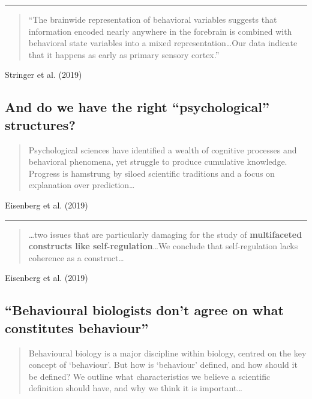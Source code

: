 \documentclass[
  letterpaper,
  DIV=11,
  numbers=noendperiod]{scrartcl}
\begin{document}
\begin{center}\rule{0.5\linewidth}{0.5pt}\end{center}

\begin{quote}
``The brainwide representation of behavioral variables suggests that
information encoded nearly anywhere in the forebrain is combined with
behavioral state variables into a mixed representation\ldots Our data
indicate that it happens as early as primary sensory cortex.''
\end{quote}

Stringer et al. (2019)

\subsection{And do we have the right ``psychological''
structures?}\label{and-do-we-have-the-right-psychological-structures}

\begin{quote}
Psychological sciences have identified a wealth of cognitive processes
and behavioral phenomena, yet struggle to produce cumulative knowledge.
Progress is hamstrung by siloed scientific traditions and a focus on
explanation over prediction\ldots{}
\end{quote}

Eisenberg et al. (2019)

\begin{center}\rule{0.5\linewidth}{0.5pt}\end{center}

\begin{quote}
\ldots two issues that are particularly damaging for the study of
\textbf{multifaceted constructs like self-regulation}\ldots We conclude
that self-regulation lacks coherence as a construct\ldots{}
\end{quote}

Eisenberg et al. (2019)

\subsection{``Behavioural biologists don't agree on what constitutes
behaviour''}\label{behavioural-biologists-dont-agree-on-what-constitutes-behaviour}

\begin{quote}
Behavioural biology is a major discipline within biology, centred on the
key concept of `behaviour'. But how is `behaviour' defined, and how
should it be defined? We outline what characteristics we believe a
scientific definition should have, and why we think it is
important\ldots{}
\end{quote}
\end{document}
